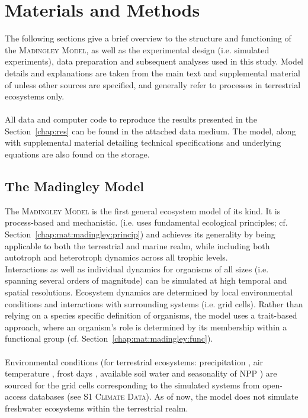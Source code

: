 \chapter{Materials and Methods}
\label{chap:mat}
The following sections give a brief overview to the    structure and functioning of the \textsc{Madingley Model}, as well as the experimental design (i.e. simulated experiments), data preparation and subsequent analyses used in this study. Model details and explanations are taken from the main text and supplemental material of \cite{Harfoot2014} unless other sources are specified, and generally refer to processes in terrestrial ecosystems only.\\\\
 All data and computer code to reproduce the results presented in the Section~\ref{chap:res} can be found in the attached data medium. The model, along with supplemental material detailing technical specifications and underlying equations are also found on the storage.
\section{The Madingley Model}
\label{chap:mat:madingley}
%
The \textsc{Madingley Model} is the first general ecosystem model of its kind. 
It is process-based  and mechanistic. (i.e. uses fundamental ecological principles; cf. Section~\ref{chap:mat:madingley:princip}) and achieves its generality by being applicable to both the terrestrial and marine realm, while including both autotroph and heterotroph dynamics across all trophic levels. \\
Interactions as well as individual  dynamics for organisms of all sizes (i.e. spanning several orders of magnitude) can be simulated at high temporal and spatial resolutions. 
Ecosystem dynamics are determined by local environmental conditions and interactions with surrounding systems (i.e. grid cells). 
Rather than relying on a species specific definition of organisms, the model uses a trait-based approach, where an organism's role is determined by its membership within a functional group (cf. Section~\ref{chap:mat:madingley:func}).
\\\\
Environmental conditions (for terrestrial ecosystems: precipitation
, air temperature , frost days , available soil water   and seasonality of NPP ) are sourced for the grid cells corresponding to the simulated systems  from open-access databases (see S1 \textsc{Climate Data}). As of now, the model does not simulate freshwater ecosystems within the terrestrial realm.
